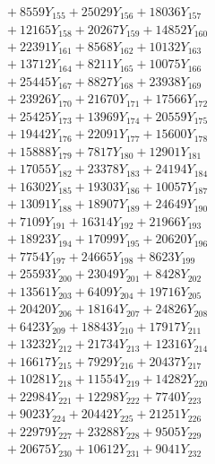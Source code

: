 \documentclass[a4paper,10pt]{article}
\begin{document}
{\begin{align}
&\;  + 8559 Y_{155} + 25029 Y_{156} + 18036 Y_{157} \\[0.3ex]
&\;  + 12165 Y_{158} + 20267 Y_{159} + 14852 Y_{160} \\[0.3ex]
&\;  + 22391 Y_{161} + 8568 Y_{162} + 10132 Y_{163} \\[0.3ex]
&\;  + 13712 Y_{164} + 8211 Y_{165} + 10075 Y_{166} \\[0.3ex]
&\;  + 25445 Y_{167} + 8827 Y_{168} + 23938 Y_{169} \\[0.3ex]
&\;  + 23926 Y_{170} + 21670 Y_{171} + 17566 Y_{172} \\[0.3ex]
&\;  + 25425 Y_{173} + 13969 Y_{174} + 20559 Y_{175} \\[0.3ex]
&\;  + 19442 Y_{176} + 22091 Y_{177} + 15600 Y_{178} \\[0.5ex]\allowbreak
&\;  + 15888 Y_{179} + 7817 Y_{180} + 12901 Y_{181} \\[0.3ex]
&\;  + 17055 Y_{182} + 23378 Y_{183} + 24194 Y_{184} \\[0.3ex]
&\;  + 16302 Y_{185} + 19303 Y_{186} + 10057 Y_{187} \\[0.3ex]
&\;  + 13091 Y_{188} + 18907 Y_{189} + 24649 Y_{190} \\[0.3ex]
&\;  + 7109 Y_{191} + 16314 Y_{192} + 21966 Y_{193} \\[0.3ex]
&\;  + 18923 Y_{194} + 17099 Y_{195} + 20620 Y_{196} \\[0.3ex]
&\;  + 7754 Y_{197} + 24665 Y_{198} + 8623 Y_{199} \\[0.3ex]
&\;  + 25593 Y_{200} + 23049 Y_{201} + 8428 Y_{202} \\[0.3ex]
&\;  + 13561 Y_{203} + 6409 Y_{204} + 19716 Y_{205} \\[0.3ex]
&\;  + 20420 Y_{206} + 18164 Y_{207} + 24826 Y_{208} \\[0.5ex]\allowbreak
&\;  + 6423 Y_{209} + 18843 Y_{210} + 17917 Y_{211} \\[0.3ex]
&\;  + 13232 Y_{212} + 21734 Y_{213} + 12316 Y_{214} \\[0.3ex]
&\;  + 16617 Y_{215} + 7929 Y_{216} + 20437 Y_{217} \\[0.3ex]
&\;  + 10281 Y_{218} + 11554 Y_{219} + 14282 Y_{220} \\[0.3ex]
&\;  + 22984 Y_{221} + 12298 Y_{222} + 7740 Y_{223} \\[0.3ex]
&\;  + 9023 Y_{224} + 20442 Y_{225} + 21251 Y_{226} \\[0.3ex]
&\;  + 22979 Y_{227} + 23288 Y_{228} + 9505 Y_{229} \\[0.3ex]
&\;  + 20675 Y_{230} + 10612 Y_{231} + 9041 Y_{232} \\[0.3ex]

\end{align}}
\end{document}
